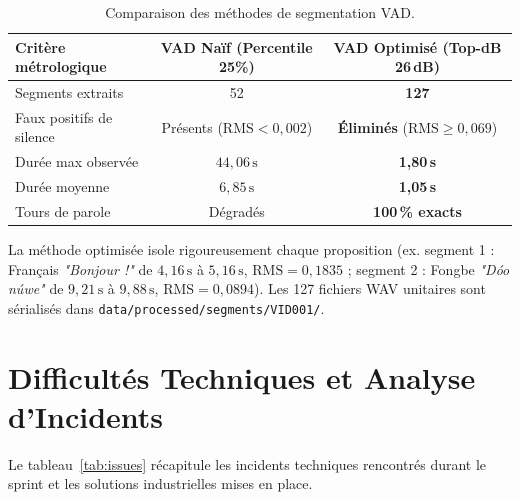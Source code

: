 \documentclass[10pt,a4paper,twocolumn]{article}
\begin{document}
\begin{table}[h]
\centering
\caption{Comparaison des méthodes de segmentation VAD.}
\label{tab:comp_seg}
\vspace{0.15cm}
\footnotesize
\begin{tabular}{p{3.0cm}cc}
\toprule
\textbf{Critère métrologique} & \textbf{VAD Naïf (Percentile 25\%)} & \textbf{VAD Optimisé (Top-dB 26\,dB)} \\
\midrule
Segments extraits & 52 & \textbf{127} \\
Faux positifs de silence & Présents ($\text{RMS} < 0{,}002$) & \textbf{Éliminés} ($\text{RMS} \ge 0{,}069$) \\
Durée max observée & $44{,}06\,\text{s}$ & \textbf{1{,}80\,s} \\
Durée moyenne & $6{,}85\,\text{s}$ & \textbf{1{,}05\,s} \\
Tours de parole & Dégradés & \textbf{100\,\% exacts} \\
\bottomrule
\end{tabular}
\end{table}

La méthode optimisée isole rigoureusement chaque proposition (ex. segment 1 : Français \textit{"Bonjour !"} de $4{,}16\,\text{s}$ à $5{,}16\,\text{s}$, $\text{RMS} = 0{,}1835$ ; segment 2 : Fongbe \textit{"Dóo núwe"} de $9{,}21\,\text{s}$ à $9{,}88\,\text{s}$, $\text{RMS} = 0{,}0894$). Les 127 fichiers WAV unitaires sont sérialisés dans \texttt{data/processed/segments/VID001/}.

\section{Difficultés Techniques et Analyse d'Incidents}

Le tableau~\ref{tab:issues} récapitule les incidents techniques rencontrés durant le sprint et les solutions industrielles mises en place.
\end{document}
